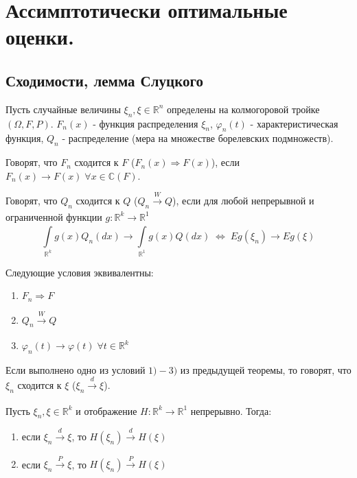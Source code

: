 \chapter{Ассимптотически оптимальные оценки.}

\section{Сходимости, лемма Слуцкого} %

Пусть случайные величины $\xi_n, \xi \in \mathbb{R}^n$ определены на колмогоровой тройке $(\Omega, F, P)$.
$F_n (x)$ - функция распределения $\xi_n$, $\varphi_n (t)$ - характеристическая функция, $Q_n$ - распределение (мера на множестве борелевских подмножеств).

\begin{definition}\label{lec:1/def:1}
	Говорят, что $F_n$ сходится к $F$  ($F_n(x) \Rightarrow F(x)$), если $F_n(x) \to F(x) \; \forall x \in \mathbb{C}(F)$.
\end{definition}

\begin{definition}\label{lec:1/def:2}
	Говорят, что $Q_n$ сходится  к $Q$ ($Q_n \xrightarrow[]{W} Q$), если для любой непрерывной и ограниченной функции $g: \mathbb{R}^k \to \mathbb{R}^1$
	$$\underset{\mathbb{R}^k}{\overset{}{\int}}g(x) Q_n(dx) \to \underset{\mathbb{R}^1}{\overset{}{\int}}g(x) Q(dx) \; \Leftrightarrow \; E g(\xi_n) \to E g(\xi)$$ 
\end{definition}

\begin{theorem}[]\label{lec:1/the:1}
	Следующие условия эквивалентны:
	\begin{enumerate}
		\item $F_n \Rightarrow F$
		\item $Q_n \xrightarrow[]{W} Q$
		\item $\varphi_n (t) \to \varphi (t) \; \forall t \in \mathbb{R}^k$
	\end{enumerate}
\end{theorem}

\begin{definition}\label{lec:1/def:3}
	Если выполнено одно из условий $1)-3)$ из предыдущей теоремы, то говорят, что $\xi_n$ сходится к $\xi$  ($\xi_n \xrightarrow[]{d}\xi$). 
\end{definition}

\begin{theorem}\label{lec:1/the:2}
	Пусть $\xi_n, \xi \in \mathbb{R}^k$ и отображение $H: \mathbb{R}^k \to \mathbb{R}^1$ непрерывно. Тогда:
	\begin{enumerate}
		\item если $\xi_n \xrightarrow[]{d} \xi$, то $H(\xi_n) \xrightarrow[]{d} H(\xi)$
		\item если $\xi_n \xrightarrow[]{P} \xi$, то $H(\xi_n) \xrightarrow[]{P} H(\xi)$
	\end{enumerate}
\end{theorem}

